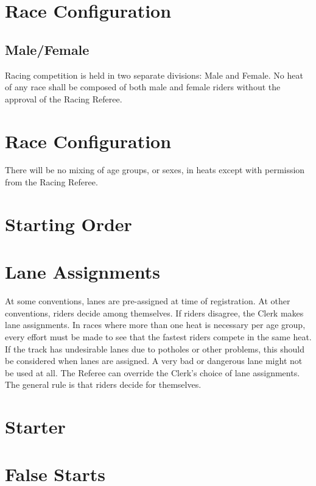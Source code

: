 \section{Race Configuration}

\subsection{Male/Female}
Racing competition is held in two separate divisions: Male and Female.
No heat of any race shall be composed of both male and female riders without the approval of the Racing Referee.

\section{Race Configuration}

There will be no mixing of age groups, or sexes, in heats except with permission from the Racing Referee.

\section{Starting Order}

\section{Lane Assignments}

At some conventions, lanes are pre-assigned at time of registration.
At other conventions, riders decide among themselves.
If riders disagree, the Clerk makes lane assignments.
In races where more than one heat is necessary per age group, every effort must be made to see that the fastest riders compete in the same heat.
If the track has undesirable lanes due to potholes or other problems, this should be considered when lanes are assigned.
A very bad or dangerous lane might not be used at all.
The Referee can override the Clerk's choice of lane assignments.
The general rule is that riders decide for themselves.

\section{Starter}
\section{False Starts}

